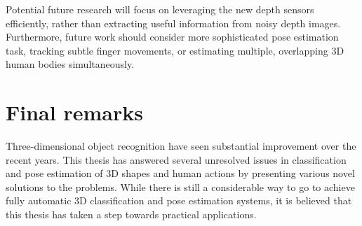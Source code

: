 Potential future research will focus on leveraging the new depth sensors efficiently, rather than extracting useful information from noisy depth images. 
Furthermore, future work should consider more sophisticated pose estimation task, \eg tracking subtle finger movements, or estimating multiple, overlapping 3D human bodies simultaneously.    




\section{Final remarks}
Three-dimensional object recognition have seen substantial improvement over the recent years.
This thesis has answered several unresolved issues in classification and pose estimation of 3D shapes and human actions by presenting various novel solutions to the problems. While there is still a considerable way to go to achieve fully automatic 3D classification and pose estimation systems, it is believed that this thesis has taken a step towards practical applications. 
